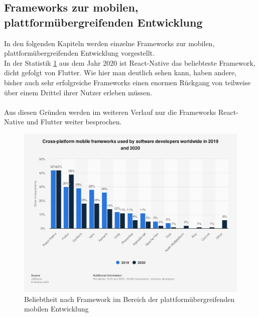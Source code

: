\subsection{Frameworks zur mobilen, plattformübergreifenden Entwicklung}
\label{sec:framework}
In den folgenden Kapiteln werden einzelne Frameworks zur mobilen, plattformübergreifenden Entwicklung vorgestellt.\\
In der Statistik \ref{fig:crossplattform_popularity} aus dem Jahr 2020 ist React-Native das beliebteste Framework, dicht gefolgt von Flutter. 
Wie hier man deutlich sehen kann, haben andere, bisher auch sehr erfolgreiche Frameworks einen enormen Rückgang von teilweise über einem Drittel ihrer Nutzer erleben müssen. \\
\\
Aus diesen Gründen werden im weiteren Verlauf nur die Frameworks React-Native und Flutter weiter besprochen.

\begin{figure}[tbt]
	\begin{center}
		\includegraphics[scale=0.4]{Theoretische_Grundlagen/images/crossplattform_popularity.png}
	\end{center}
	\caption[Beliebtheit nach Framework im Bereich der plattformübergreifenden mobilen Entwicklung]{Beliebtheit nach Framework im Bereich der plattformübergreifenden mobilen Entwicklung \protect \footnotemark}
	\label{fig:crossplattform_popularity}
\end{figure}

